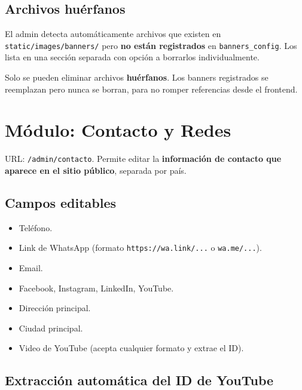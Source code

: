 \documentclass[11pt,a4paper]{article}
\begin{document}
\subsection{Archivos huérfanos}

El admin detecta automáticamente archivos que existen en
\texttt{static/images/banners/} pero \textbf{no están registrados} en
\texttt{banners\_config}. Los lista en una sección separada con opción a
borrarlos individualmente.

\begin{warningbox}
Solo se pueden eliminar archivos \textbf{huérfanos}. Los banners
registrados se reemplazan pero nunca se borran, para no romper
referencias desde el frontend.
\end{warningbox}

\section{Módulo: Contacto y Redes}

URL: \texttt{/admin/contacto}. Permite editar la \textbf{información de
contacto que aparece en el sitio público}, separada por país.

\subsection{Campos editables}

\begin{itemize}[leftmargin=*]
    \item Teléfono.
    \item Link de WhatsApp (formato \texttt{https://wa.link/...} o
        \texttt{wa.me/...}).
    \item Email.
    \item Facebook, Instagram, LinkedIn, YouTube.
    \item Dirección principal.
    \item Ciudad principal.
    \item Video de YouTube (acepta cualquier formato y extrae el ID).
\end{itemize}

\subsection{Extracción automática del ID de YouTube}
\end{document}
